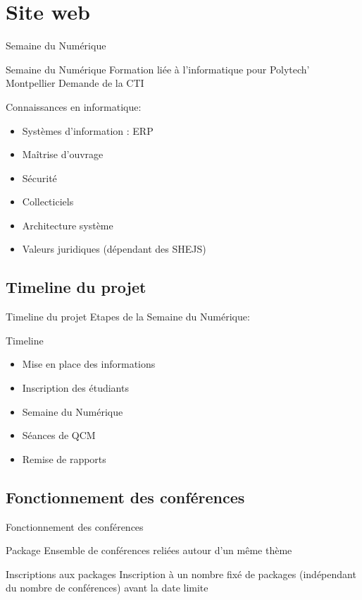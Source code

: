 \section{Site web}

\begin{frame}{Semaine du Numérique}
    \begin{block}{Semaine du Numérique}
    Formation liée à l'informatique pour Polytech' Montpellier
    Demande de la CTI

    Connaissances en informatique:
    \begin{itemize}
    \item Systèmes d’information : ERP
    \item Maîtrise d’ouvrage
    \item Sécurité
    \item Collecticiels
    \item Architecture système
    \item Valeurs juridiques (dépendant des SHEJS)
    \end{itemize}
    \end{block}
\end{frame}

\subsection{Timeline du projet}
\begin{frame}{Timeline du projet}
    Etapes de la Semaine du Numérique:
    \begin{block}{Timeline}
    \begin{itemize}
    \item Mise en place des informations
    \item Inscription des étudiants
    \item Semaine du Numérique
    \item Séances de QCM
    \item Remise de rapports
    \end{itemize}
    \end{block}
\end{frame}

\subsection{Fonctionnement des conférences}
\begin{frame}{Fonctionnement des conférences}
    \begin{block}{Package}
    Ensemble de conférences reliées autour d'un même thème
    \end{block}

    \begin{block}{Inscriptions aux packages}
    Inscription à un nombre fixé de packages (indépendant du nombre de conférences) avant la date limite
    \end{block}
\end{frame}


